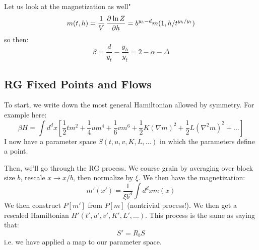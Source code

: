 Let us look at the magnetization as well"
\begin{equation}
    m(t, h) = \frac{1}{V}\dpd{\ln Z}{h} = b^{y_h - d}m(1, h/t^{y_h/y_t})
\end{equation}
so then:
\begin{equation}
    \beta = \frac{d}{y_t} - \frac{y_h}{y_t} = 2-\alpha-\Delta
\end{equation}

\subsection{RG Fixed Points and Flows}
To start, we write down the most general Hamiltonian allowed by symmetry. For example here:
\begin{equation}
    \beta H = \int d^d x\left[\frac{1}{2}tm^2 + \frac{1}{4}um^4 + \frac{1}{6}vm^6 + \frac{1}{2}K(\nabla m)^2 + \frac{1}{2}L(\nabla^2 m)^2 + \ldots\right]
\end{equation}
I now have a parameter space $S(t, u,  v, K, L, \ldots)$ in which the parameters define a point.

Then, we'll go through the RG process. We course grain by averaging over block size $b$, rescale $x \to x/b$, then normalize by $\xi$. We then have the magnetization:
\begin{equation}
    m'(x') = \frac{1}{\xi b^d}\int d^dxm(x)
\end{equation}
We then construct $P[m']$ from $P[m]$ (nontrivial process!). We then get a rescaled Hamiltonian $H'(t', u', v', K', L', \ldots)$. This process is the same as saying that:
\begin{equation}
    S' = R_b S
\end{equation}
i.e. we have applied a map to our parameter space.

